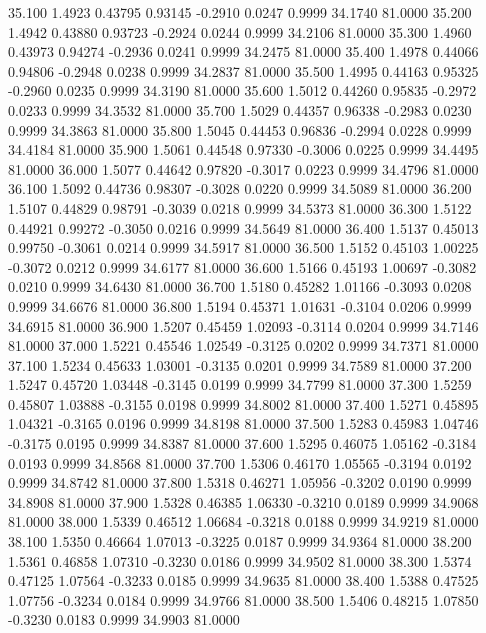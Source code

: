  35.100   1.4923   0.43795   0.93145  -0.2910   0.0247   0.9999  34.1740  81.0000
  35.200   1.4942   0.43880   0.93723  -0.2924   0.0244   0.9999  34.2106  81.0000
  35.300   1.4960   0.43973   0.94274  -0.2936   0.0241   0.9999  34.2475  81.0000
  35.400   1.4978   0.44066   0.94806  -0.2948   0.0238   0.9999  34.2837  81.0000
  35.500   1.4995   0.44163   0.95325  -0.2960   0.0235   0.9999  34.3190  81.0000
  35.600   1.5012   0.44260   0.95835  -0.2972   0.0233   0.9999  34.3532  81.0000
  35.700   1.5029   0.44357   0.96338  -0.2983   0.0230   0.9999  34.3863  81.0000
  35.800   1.5045   0.44453   0.96836  -0.2994   0.0228   0.9999  34.4184  81.0000
  35.900   1.5061   0.44548   0.97330  -0.3006   0.0225   0.9999  34.4495  81.0000
  36.000   1.5077   0.44642   0.97820  -0.3017   0.0223   0.9999  34.4796  81.0000
  36.100   1.5092   0.44736   0.98307  -0.3028   0.0220   0.9999  34.5089  81.0000
  36.200   1.5107   0.44829   0.98791  -0.3039   0.0218   0.9999  34.5373  81.0000
  36.300   1.5122   0.44921   0.99272  -0.3050   0.0216   0.9999  34.5649  81.0000
  36.400   1.5137   0.45013   0.99750  -0.3061   0.0214   0.9999  34.5917  81.0000
  36.500   1.5152   0.45103   1.00225  -0.3072   0.0212   0.9999  34.6177  81.0000
  36.600   1.5166   0.45193   1.00697  -0.3082   0.0210   0.9999  34.6430  81.0000
  36.700   1.5180   0.45282   1.01166  -0.3093   0.0208   0.9999  34.6676  81.0000
  36.800   1.5194   0.45371   1.01631  -0.3104   0.0206   0.9999  34.6915  81.0000
  36.900   1.5207   0.45459   1.02093  -0.3114   0.0204   0.9999  34.7146  81.0000
  37.000   1.5221   0.45546   1.02549  -0.3125   0.0202   0.9999  34.7371  81.0000
  37.100   1.5234   0.45633   1.03001  -0.3135   0.0201   0.9999  34.7589  81.0000
  37.200   1.5247   0.45720   1.03448  -0.3145   0.0199   0.9999  34.7799  81.0000
  37.300   1.5259   0.45807   1.03888  -0.3155   0.0198   0.9999  34.8002  81.0000
  37.400   1.5271   0.45895   1.04321  -0.3165   0.0196   0.9999  34.8198  81.0000
  37.500   1.5283   0.45983   1.04746  -0.3175   0.0195   0.9999  34.8387  81.0000
  37.600   1.5295   0.46075   1.05162  -0.3184   0.0193   0.9999  34.8568  81.0000
  37.700   1.5306   0.46170   1.05565  -0.3194   0.0192   0.9999  34.8742  81.0000
  37.800   1.5318   0.46271   1.05956  -0.3202   0.0190   0.9999  34.8908  81.0000
  37.900   1.5328   0.46385   1.06330  -0.3210   0.0189   0.9999  34.9068  81.0000
  38.000   1.5339   0.46512   1.06684  -0.3218   0.0188   0.9999  34.9219  81.0000
  38.100   1.5350   0.46664   1.07013  -0.3225   0.0187   0.9999  34.9364  81.0000
  38.200   1.5361   0.46858   1.07310  -0.3230   0.0186   0.9999  34.9502  81.0000
  38.300   1.5374   0.47125   1.07564  -0.3233   0.0185   0.9999  34.9635  81.0000
  38.400   1.5388   0.47525   1.07756  -0.3234   0.0184   0.9999  34.9766  81.0000
  38.500   1.5406   0.48215   1.07850  -0.3230   0.0183   0.9999  34.9903  81.0000
